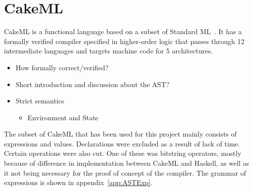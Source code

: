 \chapter{CakeML}

CakeML is a functional language based on a subset of
Standard ML~\cite{CakeML25:online}. It has a
formally verified compiler specified in higher-order logic that passes through
12 intermediate languages and targets machine code for 5 architectures.

\begin{itemize}
\item How formally correct/verified?
\item Short introduction and discussion about the AST?
\item Strict semantics
  \begin{itemize}
  \item Environment and State
  \end{itemize}
\end{itemize}

The subset of CakeML that has been used for this project mainly
consists of expressions and values. Declarations were excluded as a result of
lack of time. Certain operations were also cut. One of these was bitstring
operators, mostly because of difference in implementation between CakeML
and Haskell, as well as it not being necessary for the proof of concept of
the compiler.
The grammar of expressions is shown in appendix~\ref{app:ASTExp}.

